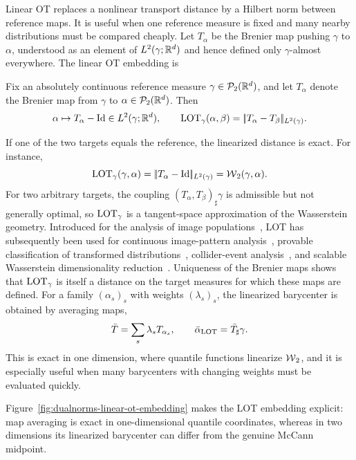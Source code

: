 Linear OT replaces a nonlinear transport distance by a Hilbert norm between reference maps. It is useful when one reference measure is fixed and many nearby distributions must be compared cheaply. Let $T_\alpha$ be the Brenier map pushing $\gamma$ to $\alpha$, understood as an element of $L^2(\gamma;\mathbb{R}^d)$ and hence defined only $\gamma$-almost everywhere. The linear OT embedding is
\begin{defn}\label{def-lot-embedding}
Fix an absolutely continuous reference measure $\gamma\in\mathcal{P}_2(\mathbb{R}^d)$, and let $T_\alpha$ denote the Brenier map from $\gamma$ to $\alpha\in\mathcal{P}_2(\mathbb{R}^d)$. Then
\begin{equation}\label{eq-lot-embedding}
	\alpha \mapsto T_\alpha-\mathrm{Id}\in L^2(\gamma;\mathbb{R}^d),
	\qquad
	\operatorname{LOT}_\gamma(\alpha,\beta)=|\!| T_\alpha-T_\beta |\!|_{L^2(\gamma)}.
\end{equation}
\end{defn}
If one of the two targets equals the reference, the linearized distance is exact. For instance,
\[
	\operatorname{LOT}_\gamma(\gamma,\alpha)
	=
	|\!| T_\alpha-\mathrm{Id} |\!|_{L^2(\gamma)}
	=
	\operatorname{\mathcal{W}}_2(\gamma,\alpha).
\]
For two arbitrary targets, the coupling $(T_\alpha,T_\beta)_\sharp\gamma$ is admissible but not generally optimal, so $\operatorname{LOT}_\gamma$ is a tangent-space approximation of the Wasserstein geometry. Introduced for the analysis of image populations~\cite{wang2013linear}, LOT has subsequently been used for continuous image-pattern analysis~\cite{kolouri2016continuous}, provable classification of transformed distributions~\cite{moosmuller2023linear}, collider-event analysis~\cite{cai2020linearized}, and scalable Wasserstein dimensionality reduction~\cite{cloninger2025linearized}. Uniqueness of the Brenier maps shows that $\operatorname{LOT}_\gamma$ is itself a distance on the target measures for which these maps are defined.
For a family $(\alpha_s)_s$ with weights $(\lambda_s)_s$, the linearized barycenter is obtained by averaging maps,
\[
	\bar T=\sum_s\lambda_s T_{\alpha_s},
	\qquad
	\bar\alpha_{\operatorname{LOT}}=\bar T_\sharp\gamma.
\]
This is exact in one dimension, where quantile functions linearize $\operatorname{\mathcal{W}}_2$, and it is especially useful when many barycenters with changing weights must be evaluated quickly.

Figure~\ref{fig:dualnorms-linear-ot-embedding} makes the LOT embedding explicit: map averaging is exact in one-dimensional quantile coordinates, whereas in two dimensions its linearized barycenter can differ from the genuine McCann midpoint.

